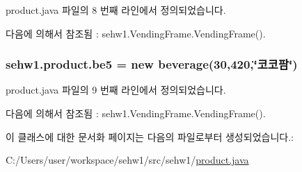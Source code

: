 product.\+java 파일의 8 번째 라인에서 정의되었습니다.



다음에 의해서 참조됨 \+:  sehw1.\+Vending\+Frame.\+Vending\+Frame().

\subsubsection[{\texorpdfstring{be5}{be5}}]{ sehw1.\+product.\+be5 = new {\bf beverage}(30,420,\char`\"{}코코팜\char`\"{})}\hypertarget{classsehw1_1_1product_a3818d4dbbdcf52983e2638206c51cc59}{}\label{classsehw1_1_1product_a3818d4dbbdcf52983e2638206c51cc59}


product.\+java 파일의 9 번째 라인에서 정의되었습니다.



다음에 의해서 참조됨 \+:  sehw1.\+Vending\+Frame.\+Vending\+Frame().



이 클래스에 대한 문서화 페이지는 다음의 파일로부터 생성되었습니다.\+:\begin{DoxyCompactItemize}
\item 
C\+:/\+Users/user/workspace/sehw1/src/sehw1/\hyperlink{product_8java}{product.\+java}\end{DoxyCompactItemize}
